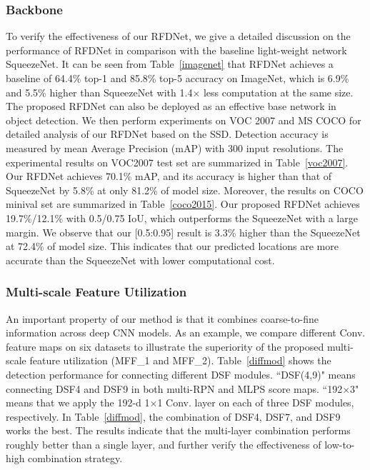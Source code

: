 \subsubsection{Backbone}
To verify the effectiveness of our RFDNet, we give a detailed discussion on the performance of RFDNet in comparison with the baseline light-weight network SqueezeNet. It can be seen from Table~\ref{imagenet} that RFDNet achieves a baseline of 64.4\% top-1 and 85.8\% top-5 accuracy on ImageNet, which is 6.9\% and 5.5\% higher than SqueezeNet with 1.4$\times$ less computation at the same size. The proposed RFDNet can also be deployed as an effective base network in object detection. We then perform experiments on VOC 2007 and MS COCO for detailed analysis of our RFDNet based on the SSD. Detection accuracy is measured by mean Average Precision (mAP) with 300 input resolutions. The experimental results on VOC2007 test set are summarized in Table~\ref{voc2007}. Our RFDNet achieves 70.1\% mAP, and its accuracy is higher than that of SqueezeNet by 5.8\% at only 81.2\% of model size. Moreover, the results on COCO minival set are summarized in Table~\ref{coco2015}. Our proposed RFDNet achieves 19.7\%/12.1\% with 0.5/0.75 IoU, which outperforms the SqueezeNet with a large margin. We observe that our [0.5:0.95] result is 3.3\% higher than the SqueezeNet at 72.4\% of model size. This indicates that our predicted locations are more accurate than the SqueezeNet with lower computational cost.

\subsubsection{Multi-scale Feature Utilization}
An important property of our method is that it combines coarse-to-fine information across deep CNN models. As an example, we compare different Conv. feature maps on six datasets to illustrate the superiority of the proposed multi-scale feature utilization (MFF\_1 and MFF\_2). Table~\ref{diffmod} shows the detection performance for connecting different DSF modules. “DSF(4,9)" means connecting DSF4 and DSF9 in both multi-RPN and MLPS score maps. “192$\times$3" means that we apply the 192-d 1$\times$1 Conv. layer on each of three DSF modules, respectively. In Table~\ref{diffmod}, the combination of DSF4, DSF7, and DSF9 works the best. The results indicate that the multi-layer combination performs roughly better than a single layer, and further verify the effectiveness of low-to-high combination strategy.

